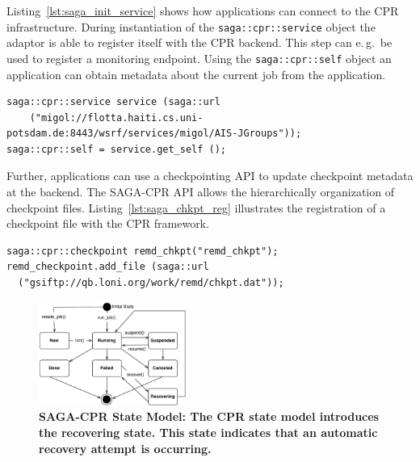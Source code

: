 \documentclass[times, 10pt, twocolumn]{article}
\newcommand{\up}{\vspace*{-1em}}
\begin{document}
Listing~\ref{lst:saga_init_service} shows how applications can connect to the CPR infrastructure. During instantiation of the \texttt{saga::cpr::service} object the adaptor is able to register itself with the CPR backend. This step can e.\,g.\ be used to register a monitoring endpoint. Using the \texttt{saga::cpr::self} object an application can obtain metadata about the current job from the application.                                                                               
\begin{lstlisting}[style=myListing, caption={\small \bf SAGA-CPR: Initialize Migol Session}, float=t, label={lst:saga_init_service}]
saga::cpr::service service (saga::url 
    ("migol://flotta.haiti.cs.uni-potsdam.de:8443/wsrf/services/migol/AIS-JGroups"));
saga::cpr::self = service.get_self ();
\end{lstlisting}

Further, applications can use a checkpointing API to update checkpoint metadata at the backend. The SAGA-CPR API allows the hierarchically 
organization of checkpoint files. 
Listing~\ref{lst:saga_chkpt_reg} illustrates 
the registration of a checkpoint file with the CPR framework.     
\begin{lstlisting}[style=myListing, caption={\small \bf SAGA-CPR: Checkpoint Registration}, float=t, label={lst:saga_chkpt_reg}]
saga::cpr::checkpoint remd_chkpt("remd_chkpt");
remd_checkpoint.add_file (saga::url 
  ("gsiftp://qb.loni.org/work/remd/chkpt.dat"));
\end{lstlisting}

\begin{figure}[h!]
    \centering
        \includegraphics[width=0.43\textwidth]{cpr-statemodel.pdf}
    \caption{\small \bf SAGA-CPR State Model: The CPR state model introduces the recovering state. This state indicates that an automatic recovery attempt is  occurring.\up\up}
    \label{fig:cpr-statemodel}
\end{figure}
 
\end{document}

